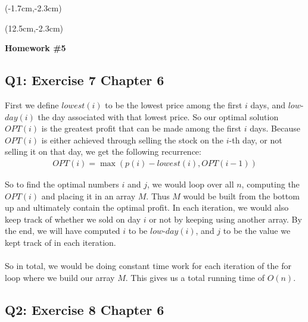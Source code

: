 \documentclass[12pt, oneside]{article}
\begin{document}
\begin{textblock*}{4cm}(-1.7cm,-2.3cm)
\end{textblock*}

\begin{textblock*}{8cm}(12.5cm,-2.3cm)
\end{textblock*}


\vspace{1cm}

\makeatletter
\setlength{\@fptop}{0pt}
\makeatother

\begin{center}
\textbf{\Large Homework \#5}
\end{center}


\subsection*{Q1: Exercise 7 Chapter 6}
First we define $lowest(i)$ to be the lowest price among the first $i$ days, and $low$-$day(i)$ the day associated with that lowest price. So our optimal solution $OPT(i)$ is the greatest profit that can be made among the first $i$ days. Because $OPT(i)$ is either achieved through selling the stock on the $i$-th day, or not selling it on that day, we get the following recurrence:
\begin{align}
OPT(i) = \max(p(i)-lowest(i), OPT(i-1))
\end{align}

So to find the optimal numbers $i$ and $j$, we would loop over all $n$, computing the $OPT(i)$ and placing it in an array $M$. Thus $M$ would be built from the bottom up and ultimately contain the optimal profit. In each iteration, we would also keep track of whether we sold on day $i$ or not by keeping using another array. By the end, we will have computed $i$ to be $low$-$day(i)$, and $j$ to be the value we kept track of in each iteration.\\\\
So in total, we would be doing constant time work for each iteration of the for loop where we build our array $M$. This gives us a total running time of $O(n)$.

\subsection*{Q2: Exercise 8 Chapter 6}
\end{document}
